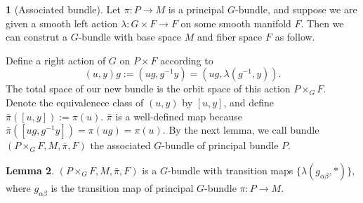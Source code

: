 \documentclass[11pt]{article}
\theoremstyle{definition}
\newtheorem{para}{}[part]
\newtheorem{lem}[para]{Lemma}
\begin{document}
\begin{para}[Associated bundle]
	Let $\pi:P\to M$ is a principal $G$-bundle, and suppose we are given a smooth left action $\lambda:G\times F\to F$ on some smooth manifold $F$. Then we can construt a $G$-bundle with base space $M$ and fiber space $F$ as follow.

	Define a right action of $G$ on $P\times F$ according to
	\[
	(u,y)g:=(ug,g^{-1}y)=(ug,\lambda(g^{-1},y)).
	\]
	The total space of our new bundle is the orbit space of this action $P\times_G F$. Denote the equivalenece class of $(u,y)$ by $[u,y]$, and define $\bar{\pi}([u,y]):=\pi(u)$. $\bar{\pi}$ is a well-defined map because $\bar{\pi}([ug,g^{-1}y])=\pi(ug)=\pi(u)$. By the next lemma, we call bundle $(P\times_G F,M,\bar{\pi},F)$ the associated $G$-bundle of principal bundle $P$.
\end{para}

\begin{lem}
	$(P\times_G F,M,\bar{\pi},F)$ is a $G$-bundle with transition maps $\{\lambda(g_{\alpha\beta},*)\}$, where $g_{\alpha\beta}$ is the transition map of principal $G$-bundle $\pi:P\to M$.
\end{lem}
\end{document}
